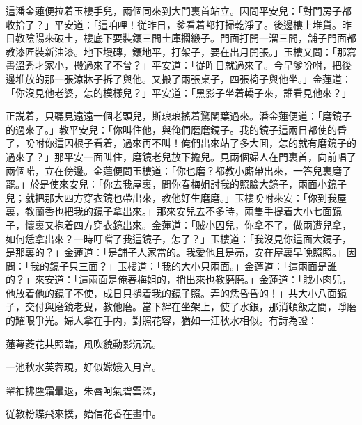 這潘金蓮便拉着玉樓手兒，兩個同來到大門裏首站立。因問平安兒：「對門房子都收拾了？」平安道：「這咱哩！従昨日，爹看着都打掃乾淨了。後邊樓上堆貨。昨日教陰陽來破土，樓底下要裝鑲三間土庫擱緞子。門面打開一溜三間，舖子門面都教漆匠裝新油漆。地下墁磚，鑲地平，打架子，要在出月開張。」玉樓又問：「那寫書溫秀才家小，搬過來了不曾？」平安道：「従昨日就過來了。今早爹吩咐，把後邊堆放的那一張涼牀子拆了與他。又搬了兩張桌子，四張椅子與他坐。」金蓮道：「你沒見他老婆，怎的模樣兒？」平安道：「黑影子坐着轎子來，誰看見他來？」

正説着，只聽見遠遠一個老頭兒，斯琅琅搖着驚閨葉過來。潘金蓮便道：「磨鏡子的過來了。」教平安兒：「你叫住他，與俺們磨磨鏡子。我的鏡子這兩日都使的昏了，吩咐你這囚根子看着，過來再不叫！俺們出來站了多大囬，怎的就有磨鏡子的過來了？」那平安一面叫住，磨鏡老兒放下擔兒。見兩個婦人在門裏首，向前唱了兩個喏，立在傍邊。金蓮便問玉樓道：「你也磨？都教小廝帶出來，一答兒裏磨了罷。」於是使來安兒：「你去我屋裏，問你春梅姐討我的照臉大鏡子，兩面小鏡子兒；就把那大四方穿衣鏡也帶出來，教他好生磨磨。」玉樓吩咐來安：「你到我屋裏，教蘭香也把我的鏡子拿出來。」那來安兒去不多時，兩隻手提着大小七面鏡子，懷裏又抱着四方穿衣鏡出來。金蓮道：「賊小囚兒，你拿不了，做兩遭兒拿，如何恁拿出來？一時叮噹了我這鏡子，怎了？」玉樓道：「我沒見你這面大鏡子，是那裏的？」金蓮道：「是舖子人家當的。我愛他且是亮，安在屋裏早晚照照。」因問：「我的鏡子只三面？」玉樓道：「我的大小只兩面。」金蓮道：「這兩面是誰的？」來安道：「這兩面是俺春梅姐的，捎出來也教磨磨。」金蓮道：「賊小肉兒，他放着他的鏡子不使，成日只撾着我的鏡子照。弄的恁昏昏的！」共大小八面鏡子，交付與磨鏡老叟，教他磨。當下絆在坐架上，使了水銀，那消頓飯之間，睜磨的耀眼爭光。婦人拿在手内，對照花容，猶如一汪秋水相似。有詩為證：

蓮萼菱花共照臨，風吹貌動影沉沉。

一池秋水芙蓉現，好似嫦娥入月宫。

翠袖拂塵霜暈退，朱唇呵氣碧雲深，

従教粉蝶飛來撲，始信花香在畫中。

